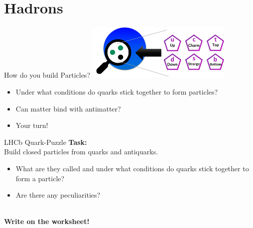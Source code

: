 \section{Hadrons}

\begin{frame}{How do you build Particles?}
    \centering
    \includegraphics[width=7cm]{Figures Lecture on Hadrons/Scale Atom_Quark_downup-approach_Hadron.png}
\begin{itemize}
    \item Under what conditions do quarks stick together to form particles?
    \item Can matter bind with antimatter? %
    \item[\ding{43}] Your turn!
\end{itemize}
\end{frame}

\newcommand\squareF{\raisebox{-2mm}{\scalebox{3}{\ding{110}}}}
\begin{frame}{LHCb Quark-Puzzle}
\textbf{Task:}\\ Build closed particles from quarks and antiquarks. \\ \begin{itemize}
    \item What are they called and under what conditions do quarks stick together to form a particle?
    \item Are there any peculiarities? %
    \end{itemize}\\
\vspace{1cm}
\textbf{Write on the worksheet!}
\end{frame}
